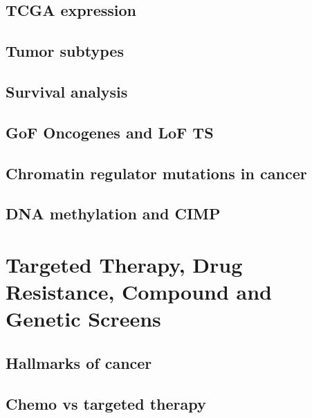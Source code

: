 \documentclass[]{book}
\begin{document}
\hypertarget{tcga-expression}{%
\section{TCGA expression}\label{tcga-expression}}

\hypertarget{tumor-subtypes}{%
\section{Tumor subtypes}\label{tumor-subtypes}}

\hypertarget{survival-analysis}{%
\section{Survival analysis}\label{survival-analysis}}

\hypertarget{gof-oncogenes-and-lof-ts}{%
\section{GoF Oncogenes and LoF TS}\label{gof-oncogenes-and-lof-ts}}

\hypertarget{chromatin-regulator-mutations-in-cancer}{%
\section{Chromatin regulator mutations in cancer}\label{chromatin-regulator-mutations-in-cancer}}

\hypertarget{dna-methylation-and-cimp}{%
\section{DNA methylation and CIMP}\label{dna-methylation-and-cimp}}

\hypertarget{tt}{%
\chapter{Targeted Therapy, Drug Resistance, Compound and Genetic Screens}\label{tt}}

\hypertarget{hallmarks-of-cancer}{%
\section{Hallmarks of cancer}\label{hallmarks-of-cancer}}

\hypertarget{chemo-vs-targeted-therapy}{%
\section{Chemo vs targeted therapy}\label{chemo-vs-targeted-therapy}}
\end{document}
